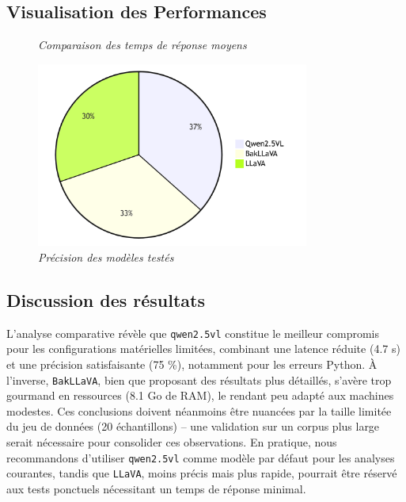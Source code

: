 \documentclass[12pt,a4paper]{report}
\begin{document}
	\subsection*{Visualisation des Performances}
	
	\begin{figure}[h]
		\centering
		\caption{\textit{Comparaison des temps de réponse moyens}}
		\label{fig:latence}
	\end{figure}
	
	\begin{figure}[H]
		\centering
		\includegraphics[width=0.8\textwidth]{precision-modeles.png}
		\caption{\textit{Précision des modèles testés}}
		\label{fig:precision-modeles}
	\end{figure}
	
	\subsection*{Discussion des résultats}
	
	L'analyse comparative révèle que \verb|qwen2.5vl| constitue le meilleur compromis pour les configurations matérielles limitées, combinant une latence réduite (4.7 s) et une précision satisfaisante (75 \%), notamment pour les erreurs Python. À l'inverse, \verb|BakLLaVA|, bien que proposant des résultats plus détaillés, s'avère trop gourmand en ressources (8.1 Go de RAM), le rendant peu adapté aux machines modestes. Ces conclusions doivent néanmoins être nuancées par la taille limitée du jeu de données (20 échantillons) – une validation sur un corpus plus large serait nécessaire pour consolider ces observations. En pratique, nous recommandons d'utiliser \verb|qwen2.5vl| comme modèle par défaut pour les analyses courantes, tandis que \verb|LLaVA|, moins précis mais plus rapide, pourrait être réservé aux tests ponctuels nécessitant un temps de réponse minimal.
	
\end{document}
